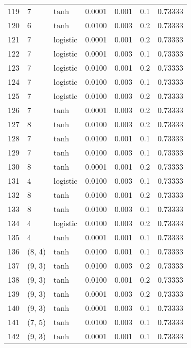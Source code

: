 \begin{tabular}{lllrrrr}
119 &           7 &      tanh &  0.0001 &  0.001 &  0.1 &   0.73333 \\
120 &           6 &      tanh &  0.0100 &  0.003 &  0.2 &   0.73333 \\
121 &           7 &  logistic &  0.0001 &  0.001 &  0.2 &   0.73333 \\
122 &           7 &  logistic &  0.0001 &  0.003 &  0.1 &   0.73333 \\
123 &           7 &  logistic &  0.0100 &  0.001 &  0.2 &   0.73333 \\
124 &           7 &  logistic &  0.0100 &  0.003 &  0.1 &   0.73333 \\
125 &           7 &  logistic &  0.0100 &  0.003 &  0.2 &   0.73333 \\
126 &           7 &      tanh &  0.0001 &  0.003 &  0.2 &   0.73333 \\
127 &           8 &      tanh &  0.0100 &  0.003 &  0.2 &   0.73333 \\
128 &           7 &      tanh &  0.0100 &  0.001 &  0.1 &   0.73333 \\
129 &           7 &      tanh &  0.0100 &  0.003 &  0.1 &   0.73333 \\
130 &           8 &      tanh &  0.0001 &  0.001 &  0.2 &   0.73333 \\
131 &           4 &  logistic &  0.0100 &  0.003 &  0.1 &   0.73333 \\
132 &           8 &      tanh &  0.0100 &  0.001 &  0.2 &   0.73333 \\
133 &           8 &      tanh &  0.0100 &  0.003 &  0.1 &   0.73333 \\
134 &           4 &  logistic &  0.0100 &  0.003 &  0.2 &   0.73333 \\
135 &           4 &      tanh &  0.0001 &  0.001 &  0.1 &   0.73333 \\
136 &      (8, 4) &      tanh &  0.0100 &  0.001 &  0.1 &   0.73333 \\
137 &      (9, 3) &      tanh &  0.0100 &  0.003 &  0.2 &   0.73333 \\
138 &      (9, 3) &      tanh &  0.0100 &  0.001 &  0.2 &   0.73333 \\
139 &      (9, 3) &      tanh &  0.0001 &  0.003 &  0.2 &   0.73333 \\
140 &      (9, 3) &      tanh &  0.0001 &  0.003 &  0.1 &   0.73333 \\
141 &      (7, 5) &      tanh &  0.0100 &  0.003 &  0.1 &   0.73333 \\
142 &      (9, 3) &      tanh &  0.0001 &  0.001 &  0.1 &   0.73333 \\

\end{tabular}
